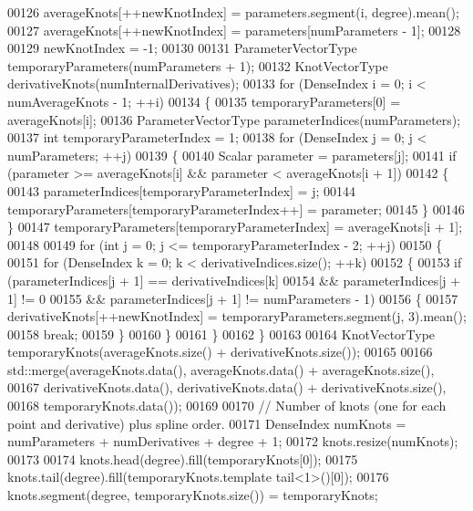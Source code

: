 \begin{DoxyCode}
00126       averageKnots[++newKnotIndex] = parameters.segment(i, degree).mean();
00127     averageKnots[++newKnotIndex] = parameters[numParameters - 1];
00128 
00129     newKnotIndex = -1;
00130   
00131     ParameterVectorType temporaryParameters(numParameters + 1);
00132     KnotVectorType derivativeKnots(numInternalDerivatives);
00133     \textcolor{keywordflow}{for} (DenseIndex i = 0; i < numAverageKnots - 1; ++i)
00134     \{
00135       temporaryParameters[0] = averageKnots[i];
00136       ParameterVectorType parameterIndices(numParameters);
00137       \textcolor{keywordtype}{int} temporaryParameterIndex = 1;
00138       \textcolor{keywordflow}{for} (DenseIndex j = 0; j < numParameters; ++j)
00139       \{
00140         Scalar parameter = parameters[j];
00141         \textcolor{keywordflow}{if} (parameter >= averageKnots[i] && parameter < averageKnots[i + 1])
00142         \{
00143           parameterIndices[temporaryParameterIndex] = j;
00144           temporaryParameters[temporaryParameterIndex++] = parameter;
00145         \}
00146       \}
00147       temporaryParameters[temporaryParameterIndex] = averageKnots[i + 1];
00148 
00149       \textcolor{keywordflow}{for} (\textcolor{keywordtype}{int} j = 0; j <= temporaryParameterIndex - 2; ++j)
00150       \{
00151         \textcolor{keywordflow}{for} (DenseIndex k = 0; k < derivativeIndices.size(); ++k)
00152         \{
00153           \textcolor{keywordflow}{if} (parameterIndices[j + 1] == derivativeIndices[k]
00154               && parameterIndices[j + 1] != 0
00155               && parameterIndices[j + 1] != numParameters - 1)
00156           \{
00157             derivativeKnots[++newKnotIndex] = temporaryParameters.segment(j, 3).mean();
00158             \textcolor{keywordflow}{break};
00159           \}
00160         \}
00161       \}
00162     \}
00163     
00164     KnotVectorType temporaryKnots(averageKnots.size() + derivativeKnots.size());
00165 
00166     std::merge(averageKnots.data(), averageKnots.data() + averageKnots.size(),
00167                derivativeKnots.data(), derivativeKnots.data() + derivativeKnots.size(),
00168                temporaryKnots.data());
00169 
00170     \textcolor{comment}{// Number of knots (one for each point and derivative) plus spline order.}
00171     DenseIndex numKnots = numParameters + numDerivatives + degree + 1;
00172     knots.resize(numKnots);
00173 
00174     knots.head(degree).fill(temporaryKnots[0]);
00175     knots.tail(degree).fill(temporaryKnots.template tail<1>()[0]);
00176     knots.segment(degree, temporaryKnots.size()) = temporaryKnots;

\end{DoxyCode}
